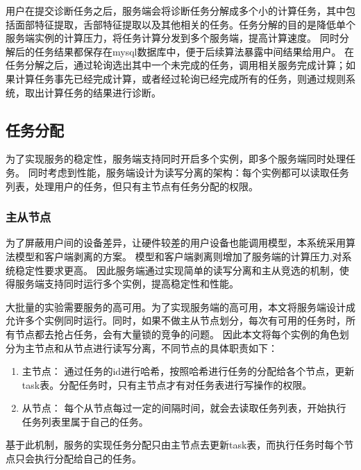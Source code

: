 用户在提交诊断任务之后，服务端会将诊断任务分解成多个小的计算任务，其中包括面部特征提取，舌部特征提取以及其他相关的任务。任务分解的目的是降低单个服务端实例的计算压力，将任务计算分发到多个服务端，提高计算速度。
同时分解后的任务结果都保存在mysql数据库中，便于后续算法暴露中间结果给用户。
在任务分解之后，通过轮询选出其中一个未完成的任务，调用相关服务完成计算；如果计算任务事先已经完成计算，或者经过轮询已经完成所有的任务，则通过规则系统，取出计算任务的结果进行诊断。



\subsection{任务分配}
为了实现服务的稳定性，服务端支持同时开启多个实例，即多个服务端同时处理任务。
同时考虑到性能，服务端设计为读写分离的架构：每个实例都可以读取任务列表，处理用户的任务，但只有主节点有任务分配的权限。


\subsubsection{主从节点}
为了屏蔽用户间的设备差异，让硬件较差的用户设备也能调用模型，本系统采用算法模型和客户端剥离的方案。
模型和客户端剥离则增加了服务端的计算压力,对系统稳定性要求更高。
因此服务端通过实现简单的读写分离和主从竞选的机制，使得服务端支持同时运行多个实例，提高稳定性和性能。


大批量的实验需要服务的高可用。为了实现服务端的高可用，本文将服务端设计成允许多个实例同时运行。同时，如果不做主从节点划分，每次有可用的任务时，所有节点都去抢占任务，会有大量锁的竞争的问题。
因此本文将每个实例的角色划分为主节点和从节点进行读写分离，不同节点的具体职责如下：

\begin{enumerate}
    \item 主节点： 通过任务的id进行哈希，按照哈希进行任务的分配给各个节点，更新task表。分配任务时，只有主节点才有对任务表进行写操作的权限。

    \item 从节点： 每个从节点每过一定的间隔时间，就会去读取任务列表，开始执行任务列表里属于自己的任务。  

\end{enumerate}

基于此机制，服务的实现任务分配只由主节点去更新task表，而执行任务时每个节点只会执行分配给自己的任务。

